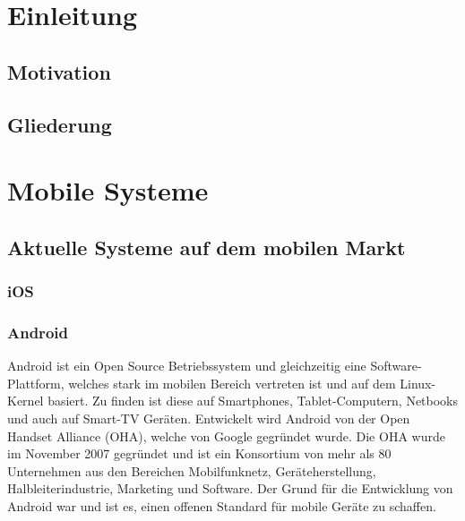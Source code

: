 \section*{\centering\abstractname}



\chapter{Einleitung}

\section{Motivation}
\section{Gliederung}

\chapter{Mobile Systeme}

\section{Aktuelle Systeme auf dem mobilen Markt}
\subsection{iOS}

\subsection{Android}
Android ist ein Open Source Betriebssystem und gleichzeitig eine Software-Plattform, welches stark im mobilen Bereich vertreten ist und auf dem Linux-Kernel basiert. Zu finden ist diese auf Smartphones, Tablet-Computern, Netbooks und auch auf Smart-TV Geräten. Entwickelt wird Android von der Open Handset Alliance (OHA), welche von Google gegründet wurde. Die OHA wurde im November 2007 gegründet und ist ein Konsortium von mehr als 80 Unternehmen aus den Bereichen Mobilfunknetz, Geräteherstellung, Halbleiterindustrie, Marketing und Software. Der Grund für die Entwicklung von Android war und ist es, einen offenen Standard für mobile Geräte zu schaffen.

